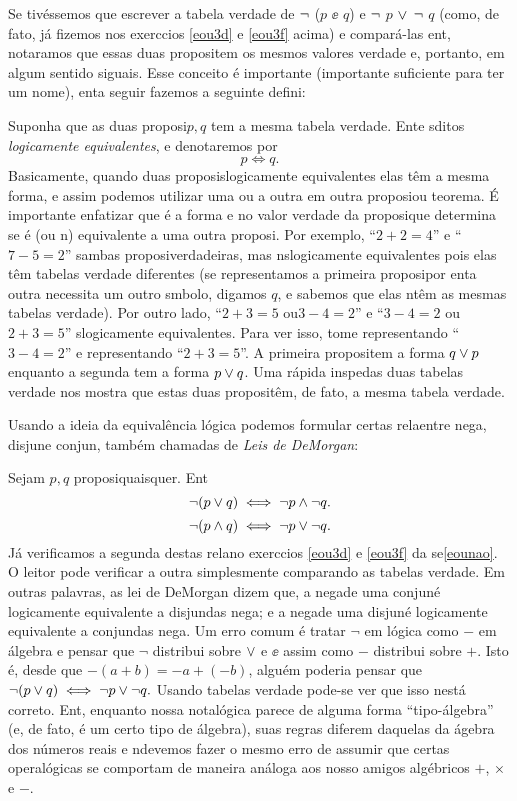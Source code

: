 Se tiv\'essemos que escrever a tabela verdade de $\lnot$ ($p$ $\ee$ $q$) e $\lnot$ $p$ $\vee$ $\lnot$ $q$ (como, de fato, j\'a fizemos nos exerc\ih cios \ref{eou3d} e \ref{eou3f} acima) e compar\'a-las ent\aoi, notar\ih amos que essas duas proposi\coes tem os mesmos valores verdade e, portanto, em algum sentido s\ao iguais. Esse conceito \'e importante (importante suficiente para ter um nome), ent\ao a seguir fazemos a seguinte defini\caoi:

Suponha que as duas proposi\coes $p,q$ tem a mesma tabela verdade. Ent\ao \pp e \qq s\ao ditos \emph{logicamente equivalentes}, e denotaremos por
\[
p \iff q.
\] 
Basicamente, quando duas proposi\coes s\ao logicamente equivalentes elas t\^em a mesma forma, e assim podemos utilizar uma ou a outra em outra proposi\cao ou teorema. \'E importante enfatizar que \'e a forma e n\ao o valor verdade da proposi\cao que determina se \'e (ou n\aoi) equivalente a uma outra proposi\caoi. Por exemplo, ``$2+2=4$'' e ``$7-5=2$'' s\ao ambas proposi\coes verdadeiras, mas n\ao s\ao logicamente equivalentes pois elas t\^em tabelas verdade diferentes (se representamos a primeira proposi\cao por \pp ent\ao a outra necessita um outro s\ih mbolo, digamos $q$, e sabemos que elas n\ao t\^em as mesmas tabelas verdade). Por outro lado, ``$2+3=5$ ou$3-4=2$'' e ``$3-4=2$ ou $2+3=5$'' s\ao logicamente equivalentes. Para ver isso, tome \pp representando ``$3-4=2$'' e \qq representando ``$2+3=5$''. A primeira proposi\cao tem a forma $q\vee p$ enquanto a segunda tem a forma $p\vee q$. Uma r\'apida inspe\cao das duas tabelas verdade nos mostra que estas duas proposi\coes t\^em, de fato, a mesma tabela verdade.

Usando a ideia da equival\^encia l\'ogica podemos formular certas rela\coes entre nega\caoi, disjun\cao e conjun\caoi, tamb\'em chamadas de \emph{Leis de DeMorgan}:

Sejam $p,q$ proposi\coes quaisquer. Ent\ao
\[
\lnot (p \vee q) \iff \lnot p \wedge \lnot q.
\]
\[
\lnot (p \wedge q) \iff \lnot p \vee \lnot q.
\]
J\'a verificamos a segunda destas rela\coes no exerc\ih cios \ref{eou3d} e \ref{eou3f} da se\cao \ref{eounao}. O leitor pode verificar a outra simplesmente comparando as tabelas verdade. Em outras palavras, as lei de DeMorgan dizem que, a nega\cao de uma conjun\cao \'e logicamente equivalente a disjun\cao das nega\cois; e a nega\cao de uma disjun\cao \'e logicamente equivalente a conjun\cao das nega\cois . Um erro comum \'e tratar $\lnot$ em l\'ogica como $-$ em \'algebra e pensar que $\lnot$ distribui sobre $\vee$ e $\ee$ assim  como $-$ distribui sobre $+$. Isto \'e, desde que $-(a+b)=-a+(-b)$, algu\'em poderia pensar que $\lnot (p \vee q) \iff \lnot p \vee \lnot q.$ Usando tabelas verdade pode-se ver que isso n\ao est\'a correto. Ent\aoi, enquanto nossa nota\cao l\'ogica parece de alguma forma ``tipo-\'algebra'' (e, de fato, \'e um certo tipo de \'algebra), suas regras diferem daquelas da \'agebra dos n\'umeros reais e n\ao devemos fazer o mesmo erro de assumir que certas opera\coes l\'ogicas se comportam de maneira an\'aloga aos nosso amigos alg\'ebricos $+$, $\times$ e $-$.

